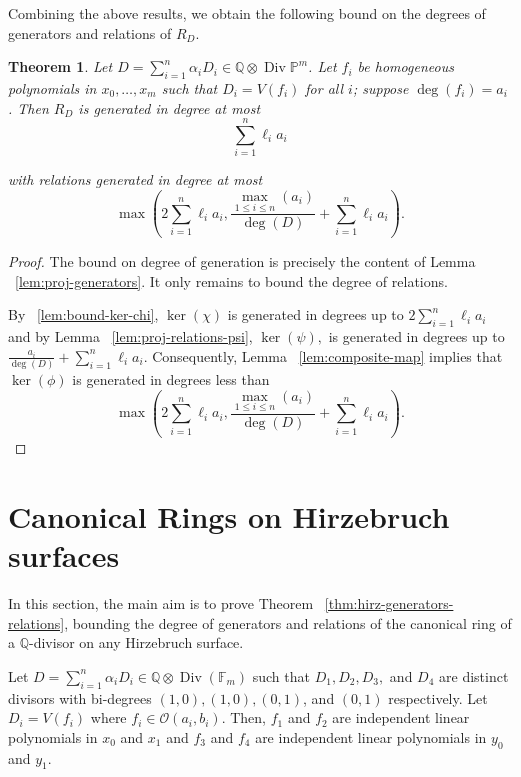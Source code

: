 \documentclass{amsart}
\theoremstyle{plain}
\newtheorem{thm}{Theorem}[section]
\theoremstyle{definition}
\theoremstyle{remark}
\numberwithin{equation}{section}
\newcommand\bq{{\mathbb Q}}
\newcommand\bp{{\mathbb P}}
\newcommand\sco{{\mathscr O}}
\DeclareMathOperator\di{Div}
\newcommand\bida{a}
\newcommand\bidb{b}
\newcommand\hirz{\mathbb{F}}
\begin{document}
Combining the above results, we obtain the following bound on the
degrees of generators and relations of $R_D$.

\begin{thm}
\label{thm:proj-generators-relations}
Let $D = \sum_{i=1}^n \alpha_i D_i \in \bq \otimes \di \bp^m$. Let
$f_i$ be homogeneous polynomials in $x_0, \ldots, x_m$ such that
$D_i = V(f_i)$ for all $i$; suppose $\deg(f_i) = a_i$. 
Then $R_D$ is generated in degree at most 
\[
	\sum_{i=1}^n \ell_i a_i
\]

\noindent
with relations generated in degree at most
\[
	\max \left(2 \sum_{i=1}^n \ell_i a_i, \frac{\max_{1\le i \le n}
	(	\bida_i)}{\deg(D)} + \sum_{i=1}^n \ell_i a_i \right).
\]
\end{thm}

\begin{proof}
The bound on degree of generation is precisely the content of Lemma 
~\ref{lem:proj-generators}. It only remains to bound the degree of 
relations.

By ~\ref{lem:bound-ker-chi}, $\ker(\chi)$ is generated in degrees 
up to $2\sum_{i=1}^n \ell_i a_i$ and by Lemma
~\ref{lem:proj-relations-psi}, $\ker(\psi),$ is generated in
degrees up to $\frac{\bida_i}{\deg(D)} + \sum_{i=1}^n \ell_i a_i$. 
Consequently, Lemma ~\ref{lem:composite-map} implies that $\ker(\phi)$
is generated in degrees less than
\[
	\max \left(2 \sum_{i=1}^n \ell_i a_i, \frac{\max_{1\le i \le n}
	(\bida_i)}{\deg(D)} + \sum_{i=1}^n \ell_i a_i \right).
\]
\end{proof}

\section{Canonical Rings on Hirzebruch surfaces}
\label{sec:hirz}
In this section, the main aim is to prove Theorem
~\ref{thm:hirz-generators-relations}, bounding the degree of
generators and relations of the canonical ring of a $\bq$-divisor
on any Hirzebruch surface.

Let $D = \sum_{i = 1}^n \alpha_i D_i \in \mathbb{Q} \otimes \di (\hirz_m)$ such
that $D_1, D_2, D_3,$ and $D_4$ are distinct divisors with bi-degrees $(1,0)
, (1,0), (0,1)$, and $(0,1)$ respectively. Let $D_i = V(f_i)$ where
$f_i \in \sco(\bida_i, \bidb_i)$.  
Then, $f_1$ and $f_2$ are independent linear
polynomials in $x_0$ and $x_1$ and $f_3$ and $f_4$ are independent
linear polynomials in $y_0$ and $y_1$. 
\end{document}
